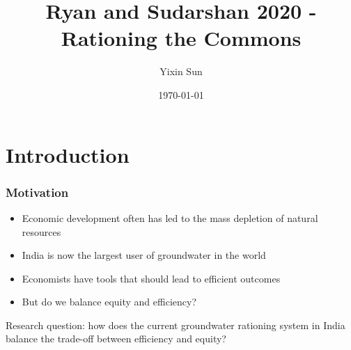 \documentclass[aspectratio=169]{beamer}
\title{Ryan and Sudarshan 2020 - Rationing the Commons}
\author{Yixin Sun}
\institute{\emph{EEE Presentation}}
\date{\today}
\begin{document}
\begin{frame}
\titlepage
\end{frame}


\section{Introduction}
\begin{frame}
    \frametitle{Motivation}
    \begin{itemize}
        \item Economic development often has led to the mass depletion of natural resources  \pause 
        \item India is now the largest user of groundwater in the world \pause 
        \item Economists have tools that should lead to efficient outcomes \pause
        \item But do we balance equity and efficiency? \pause 
    \end{itemize}

    Research question: how does the current groundwater rationing system in India balance the trade-off between efficiency and equity?

\end{frame}
\end{document}
